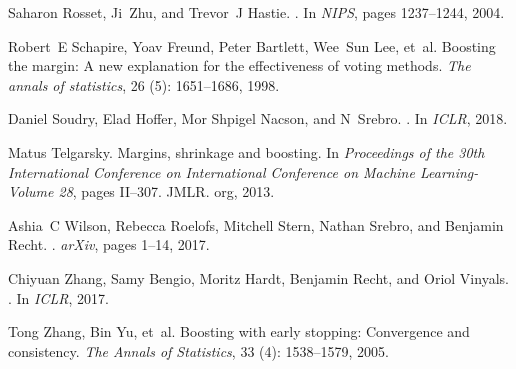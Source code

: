 \documentclass[twoside,11pt,english]{article}
\begin{document}
\begin{thebibliography}{21}
	Saharon Rosset, Ji~Zhu, and Trevor~J Hastie.
	.
	\newblock In \emph{NIPS}, pages 1237--1244, 2004.

	
	Robert~E Schapire, Yoav Freund, Peter Bartlett, Wee~Sun Lee, et~al.
	\newblock Boosting the margin: A new explanation for the effectiveness of
	voting methods.
	\newblock \emph{The annals of statistics}, 26 (5):
	1651--1686, 1998.
	
	Daniel Soudry, Elad Hoffer, Mor {Shpigel Nacson}, and N~Srebro.
	.
	\newblock In \emph{ICLR}, 2018.
	
	Matus Telgarsky.
	\newblock Margins, shrinkage and boosting.
	\newblock In \emph{Proceedings of the 30th International Conference on
		International Conference on Machine Learning-Volume 28}, pages II--307. JMLR.
	org, 2013.
	
	Ashia~C Wilson, Rebecca Roelofs, Mitchell Stern, Nathan Srebro, and Benjamin
	Recht.
	.
	\newblock \emph{arXiv}, pages 1--14, 2017.
	
	Chiyuan Zhang, Samy Bengio, Moritz Hardt, Benjamin Recht, and Oriol Vinyals.
	.
	\newblock In \emph{ICLR}, 2017.
	
	Tong Zhang, Bin Yu, et~al.
	\newblock Boosting with early stopping: Convergence and consistency.
	\newblock \emph{The Annals of Statistics}, 33 (4):
	1538--1579, 2005.
	
\end{thebibliography}
\end{document}
